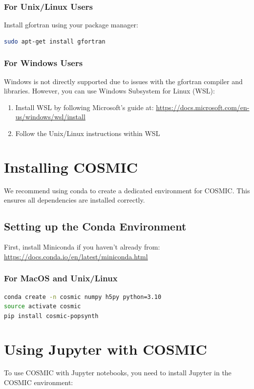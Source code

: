\documentclass[a4paper,11pt]{article}
\begin{document}
\subsubsection{For Unix/Linux Users}
Install gfortran using your package manager:
\begin{lstlisting}[language=bash]
sudo apt-get install gfortran
\end{lstlisting}

\subsubsection{For Windows Users}
Windows is not directly supported due to issues with the gfortran compiler and libraries. However, you can use Windows Subsystem for Linux (WSL):
\begin{enumerate}
    \item Install WSL by following Microsoft's guide at: \url{https://docs.microsoft.com/en-us/windows/wsl/install}
    \item Follow the Unix/Linux instructions within WSL
\end{enumerate}

\section{Installing COSMIC}
We recommend using conda to create a dedicated environment for COSMIC. This ensures all dependencies are installed correctly.

\subsection{Setting up the Conda Environment}
First, install Miniconda if you haven't already from: \url{https://docs.conda.io/en/latest/miniconda.html}

\subsubsection{For MacOS and Unix/Linux}
\begin{lstlisting}[language=bash]
conda create -n cosmic numpy h5py python=3.10
source activate cosmic
pip install cosmic-popsynth
\end{lstlisting}

\section{Using Jupyter with COSMIC}
To use COSMIC with Jupyter notebooks, you need to install Jupyter in the COSMIC environment:
\end{document}
